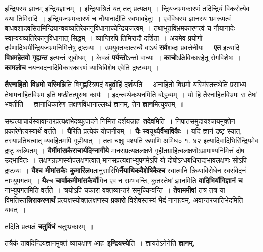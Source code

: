 \documentclass[article,12pt,a4paper]{memoir}
\begin{document}
	इन्द्रियस्य ज्ञानम् इन्द्रियज्ञानम् । इन्द्रियाश्रितं यत् तत् प्रत्यक्षम् । न्द्रियजभ्रमकारणं तदिन्द्रियं विकरोत्येव यथा तिमिरादि । इन्द्रियजभ्रमकारणं च नौयानादीति स्वभावहेतुः । एवंविधस्य ज्ञानस्य भ्रमरूपत्वं बाधवशादवसितमिन्द्रियान्वयव्यतिरेकानुविधानाच्चेन्द्रियजत्वम् । तथाभूतविभ्रमकारणत्वं च नौयानादेः स्वान्वयव्यतिरेकानुविधानात् सिद्धम् । व्याप्तिरपि तिमिरादौ दर्शिता । अयमेव प्रयोगो दर्पणादिष्वपीन्द्रियजभ्रमनिमित्तेषु द्रष्टव्यः । उपयुक्तकार्त्स्न्ये वाऽयं \textbf{सर्व}शब्दः प्रवर्त्तनीयः । \textbf{एत} इत्यादि \textbf{विभ्रमहेतवो गृह्यन्त} इत्यन्तं सुबोधम् । केवलं \textbf{पर्यन्तो}ऽन्तो वाच्यः । \textbf{काचो}ऽक्षिविकारहेतू रोगविशेषः । \textbf{कामलोच}  नयनवदनादिविकारकारणं व्याधिविशेष एवेति द्रष्टव्यम् ।
	\pend
      

	  \pstart \textbf{तैरनाहितो विभ्रमो यस्मिन्नि}ति विगृह्णंस्त्रिपदं बहुव्रीहिं दर्शयति । अनाहितो विभ्रमो यस्मिंस्तत्तथेति प्रसाध्य तेषामनाहितविभ्रम इति षष्ठीतत्पुरुषः कार्यः । इदन्त्वर्थकथनमिति बोद्धव्यम् । यो हि तैरनाहितविभ्रमः स तेषां भवतीति । ज्ञानाधिकारेण लक्षणविधानाल्लब्धं ज्ञानम्, तेन \textbf{ज्ञान}मित्युक्तम् ॥
	\pend
      

	  \pstart सम्प्रत्याचार्यस्यावान्तरप्रत्यक्षभेदव्युत्पादने निमित्तं दर्शयन्नाह--\textbf{तदेव}मिति । निपातसमुदायश्चायमुक्तेन प्रकारेणेत्यस्यार्थे वर्त्तते । \textbf{यै}रिति प्रत्येकं योजनीयम् । \textbf{यैः} स्वयूथ्यै\textbf{र्वैभाषिकैः} । यदि ज्ञानं द्रष्टृ स्यात्, तस्याप्रतिघत्वात् व्यवहितमपि गृह्णीयात् । ततः चक्षुः पश्यति रूपाणि \href{http://sarit.indology.info/?cref=ak.1.42}{अभिध० १. ४२} इत्यादिवादिभिरिन्द्रियमेव द्रष्टृ कल्पितम् । \textbf{यैर्मीमांसकैराचार्यदिग्नागीये} मानसप्रत्यक्षलक्षणे गृहीतग्राहित्वलक्षणोऽप्रामाण्यनिमित्तं दोष उद्भावितः । लक्षणग्रहणस्योपलक्षणत्वात् मानसप्रत्यक्षाभ्युपगमेऽपि यो दोषोऽन्धबधिराद्यभावलक्षणः सोऽपि द्रष्टव्यः । \textbf{यैश्च मीमांसकैः कुमारिल}मतानुसारिभि\textbf{र्नैयायिकवैशेषिकैश्च} स्वात्मनि क्रियाविरोधेन स्वसंवेदनं नाभ्युपगतम् । \textbf{यै}श्च \textbf{चार्वाकमीमांसकैर्यो}गिन एव न सम्भवन्ति, कुतस्तेषां ज्ञानमिति \textbf{वादिभिर्योगिज्ञानं च} नाभ्युपगतमिति वर्त्तते । त्रयोऽपि चकारा वक्तव्यान्तरं समुच्चिन्वन्ति । \textbf{तेषाममीषां} तत्र तत्र या विमतिस्त\textbf{न्निराकरणार्थं} प्रत्यक्षस्योक्तलक्षणस्य \textbf{प्रकारो} विशेषस्तस्यं \textbf{भेदं} नानात्वम्, अवान्तरजातिभेदमिति यावत् ।
	\pend
      

	  \pstart तदिति प्रत्यक्षं \textbf{चतुर्विधं} चतुष्प्रकारम् ॥
	\pend
      

	  \pstart तत्रैकं तावदिन्द्रियज्ञानमुक्तं व्याचक्षाण आह--\textbf{इन्द्रियस्ये}ति । ज्ञायतेऽनेनेति \textbf{ज्ञानम्,}  \leavevmode{} 
	  
\end{document}
